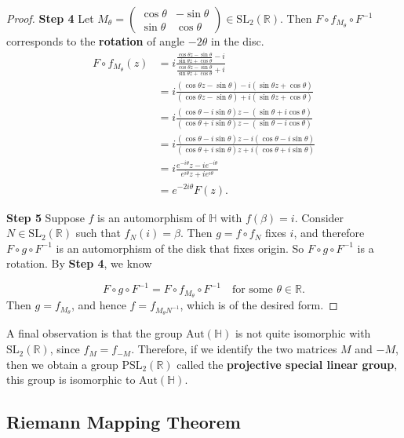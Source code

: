 \documentclass{article}
\begin{document}
\begin{proof}
\textbf{Step 4}
Let $M_\theta = \begin{pmatrix} \cos \theta & -\sin \theta \\ \sin \theta & \cos \theta \end{pmatrix} \in \text{SL}_2(\mathbb{R})$.
Then $F \circ f_{M_\theta} \circ F^{-1}$ corresponds to the \textbf{rotation} of angle $-2\theta$ in the disc.
\begin{align*}
F \circ f_{M_\theta}(z) &= i \frac{\frac{\cos \theta z - \sin \theta}{\sin \theta z + \cos \theta} - i}{\frac{\cos \theta z - \sin \theta}{\sin \theta z + \cos \theta} + i} \\
&= i \frac{(\cos \theta z - \sin \theta) - i(\sin \theta z + \cos \theta)}{(\cos \theta z - \sin \theta) + i(\sin \theta z + \cos \theta)} \\
&= i \frac{(\cos \theta - i \sin \theta) z - (\sin \theta + i \cos \theta)}{(\cos \theta + i \sin \theta) z - (\sin \theta - i \cos \theta)} \\
&= i \frac{(\cos \theta - i \sin \theta) z - i(\cos \theta - i \sin \theta)}{(\cos \theta + i \sin \theta) z + i(\cos \theta + i \sin \theta)} \\
&= i \frac{e^{-i\theta} z - i e^{-i\theta}}{e^{i\theta} z + i e^{i\theta}} \\
&= e^{-2i\theta} F(z).
\end{align*}

\textbf{Step 5} 
Suppose $f$ is an automorphism of $\mathbb{H}$ with $f(\beta) = i$.
Consider $N \in \text{SL}_2(\mathbb{R})$ such that $f_N(i) = \beta$.
Then $g = f \circ f_N$ fixes $i$, and therefore $F \circ g \circ F^{-1}$ is an automorphism of the disk that fixes origin.
So $F \circ g \circ F^{-1}$ is a rotation. By \textbf{Step 4}, we know

$$F \circ g \circ F^{-1} = F \circ f_{M_\theta} \circ F^{-1} \quad \text{for some } \theta \in \mathbb{R}.$$
Then $g = f_{M_\theta}$, and hence $f = f_{M_{\theta} N^{-1}}$, which is of the desired form.
\end{proof}

A final observation is that the group $\text{Aut}(\mathbb{H})$ is not quite isomorphic with $\text{SL}_2(\mathbb{R})$, since $f_M = f_{-M}$.
Therefore, if we identify the two matrices $M$ and $-M$, then we obtain a group $\text{PSL}_2(\mathbb{R})$ called the \textbf{projective special linear group}, this group is isomorphic to $\text{Aut}(\mathbb{H})$.

\subsection*{Riemann Mapping Theorem}
\end{document}

